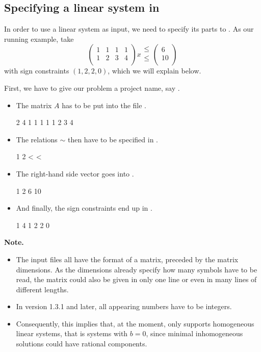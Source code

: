 \subsection{Specifying a linear system in \FourTiTwo}

In order to use a linear system as input, we need to specify its
parts to \FourTiTwo. As our running example, take
\[
\left(
\begin{array}{cccc}
1 & 1 & 1 & 1\\
1 & 2 & 3 & 4\\
\end{array}
\right)x
\begin{array}{c}
\leq\\
\leq\\
\end{array}
\left(
\begin{array}{c}
6\\
10\\
\end{array}
\right)
\]
with sign constraints $(1,2,2,0)$, which we will explain below.

First, we have to give our problem a project name, say
.
\begin{itemize}
\item The matrix $A$ has to be put into the file .
\begin{myverbatim}
2 4
1 1 1 1
1 2 3 4
\end{myverbatim}
\item The relations $\sim$ then have to be specified in .
\begin{myverbatim}
1 2
< <
\end{myverbatim}
\item The right-hand side vector goes into .
\begin{myverbatim}
1 2
6 10
\end{myverbatim}
\item And finally, the sign constraints end up in .
\begin{myverbatim}
1 4
1 2 2 0
\end{myverbatim}
\end{itemize}

{\bf Note.}
\begin{itemize}
\item The input files all have the format of a matrix, preceded by
  the matrix dimensions. As the dimensions already specify how many symbols
  have to be read, the matrix could also be given in only one line or even
  in many lines of different lengths.
\item In \FourTiTwo{} version 1.3.1 and later, all appearing numbers have to be
  integers.
\item Consequently, this implies that, at the moment, 
  only supports homogeneous linear systems, that is systems with
  $b=0$, since minimal inhomogeneous solutions could have rational
  components.
\end{itemize}



